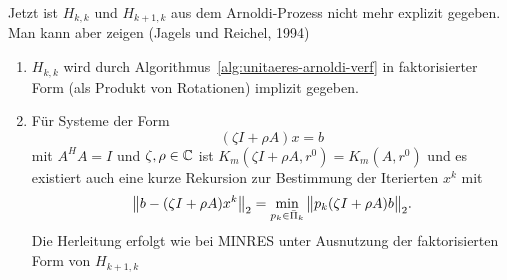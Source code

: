 \begin{bsp}
  Jetzt ist $H_{k,k}$ und $H_{k+1,k}$ aus dem Arnoldi-Prozess nicht
  mehr explizit gegeben. Man kann aber zeigen (Jagels und Reichel, 1994)
  \begin{enumerate}
  \item $H_{k,k}$ wird durch Algorithmus~\ref{alg:unitaeres-arnoldi-verf}
    in faktorisierter Form (als Produkt von Rotationen) implizit gegeben.
  \item F\"ur Systeme der Form
    \begin{equation*}
      (\zeta I+\rho A)x=b
    \end{equation*}
    mit $A^HA=I$ und $\zeta,\rho\in\mathbb{C}$ ist
    $K_m(\zeta I+\rho A,r^0)=K_m(A,r^0)$ und es existiert auch eine
    kurze Rekursion zur Bestimmung der Iterierten $x^k$ mit
    \begin{equation*}
      \norm[big]{b-(\zeta I+\rho A)x^k}_2
      =
      \min_{p_k\in\bar \Pi_k}
      \norm[big]{p_k(\zeta I+\rho A)b}_2
      .
    \end{equation*}
    Die Herleitung erfolgt wie bei MINRES unter Ausnutzung der faktorisierten
    Form von $H_{k+1,k}$
  \end{enumerate}

\end{bsp}





